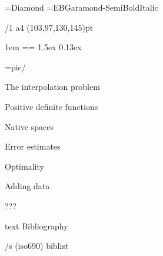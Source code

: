 \useOpTeX  %


\hyperlinks \Black \Black
{}

\enlang
\fontfam[GaramondMT]\let\semibold\relax \typosize[12.5/14.7]%



\font\symbols=Diamond %
\def\QED{\hbox{\symbols\resizethefont \,❖}}
\font\boldmathfont=EBGaramond-SemiBoldItalic


\margins/1 a4 (103,97,130,145)pt


\parindent 1em
\iindent=\parindent \ttindent=\parindent
\parskip 1.5ex
 0.13ex

\picdir={pic/}



\sec The interpolation problem


\sec[positivesec] Positive definite functions


\sec Native spaces


\sec[errorsec] Error estimates


\sec Optimality


\sec[addingsec] Adding data


\sec[???sec] ???







\bgroup
\let\_mtext\ignoreit
\nonum\chap Bibliography

\def\_opwarning#1{}
\usebib/s (iso690) biblist
\egroup

\bye
